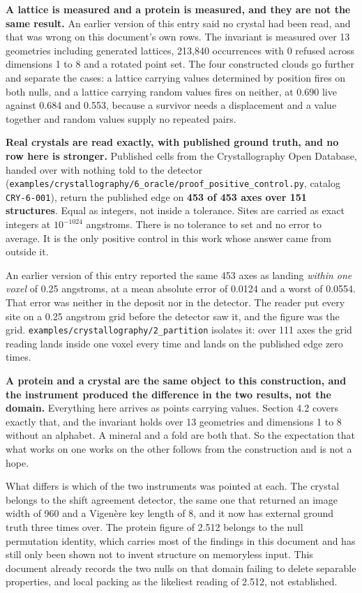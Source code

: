 \textbf{A lattice is measured and a protein is measured, and they are not the same result.} An earlier version of this entry said no crystal had been read, and that was wrong on this document's own rows. The invariant is measured over 13 geometries including generated lattices, 213,840 occurrences with 0 refused across dimensions 1 to 8 and a rotated point set. The four constructed clouds go further and separate the cases: a lattice carrying values determined by position fires on both nulls, and a lattice carrying random values fires on neither, at 0.690 live against 0.684 and 0.553, because a survivor needs a displacement and a value together and random values supply no repeated pairs.

\textbf{Real crystals are read exactly, with published ground truth, and no row here is stronger.} Published cells from the Crystallography Open Database, handed over with nothing told to the detector (\texttt{examples/\allowbreak{}crystallography/\allowbreak{}6\_\allowbreak{}oracle/\allowbreak{}proof\_\allowbreak{}positive\_\allowbreak{}control.\allowbreak{}py}, catalog \texttt{CRY-6-001}), return the published edge on \textbf{453 of 453 axes over 151 structures}. Equal as integers, not inside a tolerance. Sites are carried as exact integers at \(10^{-1024}\) angstroms. There is no tolerance to set and no error to average. It is the only positive control in this work whose answer came from outside it.

An earlier version of this entry reported the same 453 axes as landing \emph{within one voxel} of 0.25 angstroms, at a mean absolute error of 0.0124 and a worst of 0.0554. That error was neither in the deposit nor in the detector. The reader put every site on a 0.25 angstrom grid before the detector saw it, and the figure was the grid. \texttt{examples/\allowbreak{}crystallography/\allowbreak{}2\_\allowbreak{}partition} isolates it: over 111 axes the grid reading lands inside one voxel every time and lands on the published edge zero times.

\textbf{A protein and a crystal are the same object to this construction, and the instrument produced the difference in the two results, not the domain.} Everything here arrives as points carrying values. Section 4.2 covers exactly that, and the invariant holds over 13 geometries and dimensions 1 to 8 without an alphabet. A mineral and a fold are both that. So the expectation that what works on one works on the other follows from the construction and is not a hope.

What differs is which of the two instruments was pointed at each. The crystal belongs to the shift agreement detector, the same one that returned an image width of 960 and a Vigenère key length of 8, and it now has external ground truth three times over. The protein figure of 2.512 belongs to the null permutation identity, which carries most of the findings in this document and has still only been shown not to invent structure on memoryless input. This document already records the two nulls on that domain failing to delete separable properties, and local packing as the likeliest reading of 2.512, not established.

